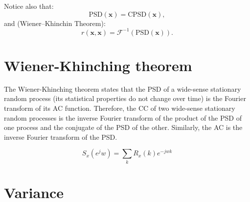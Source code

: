 Notice also that:
\begin{equation}
  \text{PSD}(\mathbf{x}) = \text{CPSD}(\mathbf{x}),
\end{equation}
and (Wiener–Khinchin Theorem):
\begin{equation}
  r(\mathbf{x},\mathbf{x}) = \mathcal{F}^{-1}(\text{PSD}(\mathbf{x})).
\end{equation}


\begin{comment}
\section{Energy Spectral Density (ESD)}

The ESD of a signal describes the distribution of the
energy\footnote{That obviously must be finite.} of the signal over
their frequency components. For a discrete-time signal $\mathbf{x}$,
the $\text{ESD}(\mathbf{x})$ is defined as
\begin{equation}
  \text{ESD}(\mathbf{x})=|\mathbf{X}|^2=\mathbf{X}\mathbf{X}^*,
\end{equation}
where $\mathbf{X}$ the DFT of $\mathbf{x}$, and $\mathbf{X}^*$ is its
complex conjugate.

\end{comment}

\section{Wiener-Khinching theorem}
\label{sec:WKT}

The Wiener-Khinching theorem states that the \gls{PSD} of a wide-sense
stationary random process (its statistical properties do not change
over time) is the Fourier transform of its \gls{AC}
function. Therefore, the \gls{CC} of two wide-sense stationary random
processes is the inverse Fourier transform of the product of the
\gls{PSD} of one process and the conjugate of the \gls{PSD} of the
other. Similarly, the \gls{AC} is the inverse Fourier transform
of the \gls{PSD}.

\begin{equation}
  S_x(e^jw)=\sum_kR_x(k)e^{-jwk}
\end{equation}


\section{Variance}
\label{sec:variance}

